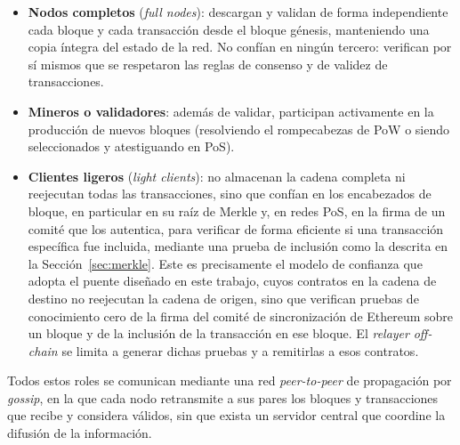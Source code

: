 \begin{itemize}
	\item \textbf{Nodos completos} (\textit{full nodes}): descargan y validan de forma
	independiente cada bloque y cada transacción desde el bloque génesis, manteniendo una copia
	íntegra del estado de la red. No confían en ningún tercero: verifican por sí mismos que se
	respetaron las reglas de consenso y de validez de transacciones.

	\item \textbf{Mineros o validadores}: además de validar, participan activamente en la
	producción de nuevos bloques (resolviendo el rompecabezas de PoW o siendo seleccionados y
	atestiguando en PoS).

	\item \textbf{Clientes ligeros} (\textit{light clients}): no almacenan la cadena completa ni
	reejecutan todas las transacciones, sino que confían en los encabezados de bloque, en
	particular en su raíz de Merkle y, en redes PoS, en la firma de un comité que los autentica,
	para verificar de forma eficiente si una transacción específica fue incluida,
	mediante una prueba de inclusión como la descrita en la Sección~\ref{sec:merkle}. Este es
	precisamente el modelo de confianza que adopta el puente diseñado en este trabajo, cuyos
	contratos en la cadena de destino no reejecutan la cadena de origen, sino que verifican pruebas
	de conocimiento cero de la firma del comité de sincronización de Ethereum sobre un bloque y de
	la inclusión de la transacción en ese bloque. El \textit{relayer} \textit{off-chain} se limita
	a generar dichas pruebas y a remitirlas a esos contratos.
\end{itemize}

Todos estos roles se comunican mediante una red \textit{peer-to-peer} de propagación por
\textit{gossip}, en la que cada nodo retransmite a sus pares los bloques y transacciones que
recibe y considera válidos, sin que exista un servidor central que coordine la difusión de la
información.
